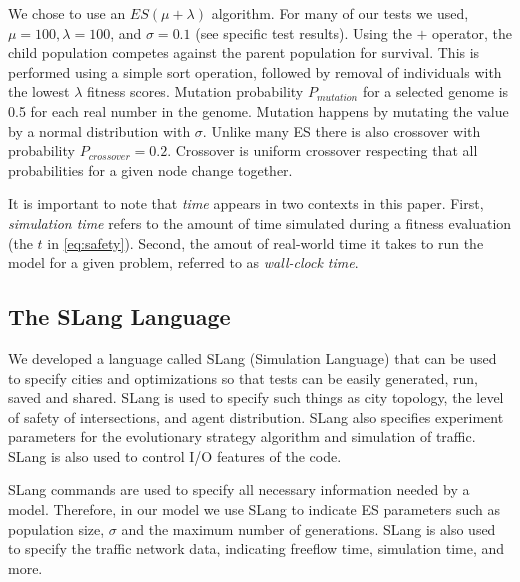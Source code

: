 \documentclass{sig-alternate-05-2015}
\begin{document}
We chose to use an $ES(\mu + \lambda)$ algorithm.  For many of our
tests we used, $\mu = 100, \lambda = 100$, and $\sigma = 0.1$ (see
specific test results).  Using the $+$ operator, the child population
competes against the parent population for survival.  This is
performed using a simple sort operation, followed by removal of
individuals with the lowest $\lambda$ fitness scores.  Mutation
probability $P_{mutation}$ for a selected genome is 0.5 for each real number
in the genome.  Mutation happens by mutating the value by a normal
distribution with $\sigma$.  Unlike many ES there is also crossover
with probability $P_{crossover}=0.2$.  Crossover is uniform crossover
respecting that all probabilities for a given node change together.

It is important to note that \emph{time} appears in two contexts in this
paper. First, \emph{simulation time} refers to the amount of time
simulated during a fitness evaluation (the $t$ in \ref{eq:safety}). Second,
the amout of real-world time it takes to run the model for a given problem,
referred to as \emph{wall-clock time}.

\subsection{The SLang Language}
We developed a language called SLang (Simulation Language) that can be
used to specify cities and optimizations so that tests can be easily
generated, run, saved and shared.  SLang is used to specify such
things as city topology, the level of safety of intersections, and
agent distribution. 
SLang also specifies experiment parameters for the evolutionary
strategy algorithm and simulation of traffic.  SLang is also used to 
control I/O features of the code.

SLang commands are used to specify all necessary information needed
by a model. Therefore, in our model we use SLang to indicate ES 
parameters such as population size, $\sigma$ and the maximum 
number of generations. SLang is also used to specify the traffic 
network data, indicating freeflow time, simulation time, and more.
\end{document}
